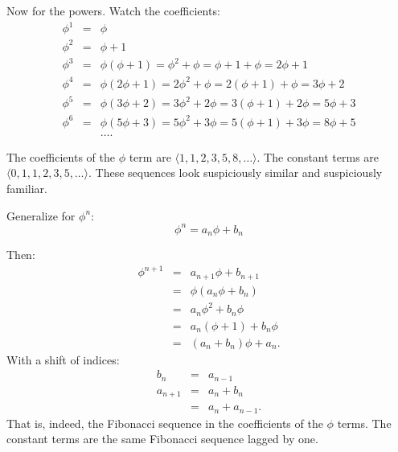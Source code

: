 \documentclass{article}
\begin{document}
Now for the powers.  Watch the coefficients:
\begin{eqnarray*}
  \phi^1 & = & \phi \\
  \phi^2 & = & \phi + 1 \\
  \phi^3 & = & \phi(\phi + 1) = \phi^2 + \phi = \phi + 1 + \phi = 2\phi + 1 \\
  \phi^4 & = & \phi(2\phi + 1) = 2\phi^2 + \phi = 2(\phi + 1) + \phi = 3\phi + 2 \\
  \phi^5 & = & \phi(3\phi + 2) = 3\phi^2 + 2\phi = 3(\phi + 1) + 2\phi = 5\phi + 3 \\
  \phi^6 & = & \phi(5\phi + 3) = 5\phi^2 + 3\phi = 5(\phi + 1) + 3\phi = 8\phi + 5 \\
  & & \ldots.
\end{eqnarray*}

The coefficients of the $\phi$ term are $\langle 1, 1, 2, 3, 5, 8, \ldots\rangle$.  The constant terms are $\langle 0, 1, 1, 2, 3, 5, \ldots\rangle$.  These sequences look suspiciously similar and suspiciously familiar.

Generalize for $\phi^n$:
\begin{equation}
  \phi^n = a_n\phi + b_n
\end{equation}

Then:
\begin{eqnarray*}
  \phi^{n+1} & = & a_{n+1}\phi + b_{n+1} \\
  & = & \phi(a_n\phi + b_n) \\
  & = & a_n\phi^2 + b_n\phi \\
  & = & a_n(\phi + 1) + b_n\phi \\
  & = & (a_n + b_n) \phi + a_n.
\end{eqnarray*}
With a shift of indices:
\begin{eqnarray*}
  b_n & = & a_{n-1} \\
  a_{n+1} & = & a_n + b_n \\
  & = & a_n + a_{n-1}.
\end{eqnarray*}
That is, indeed, the Fibonacci sequence in the coefficients of the $\phi$ terms.  The constant terms are the same Fibonacci sequence lagged by one.
\end{document}
